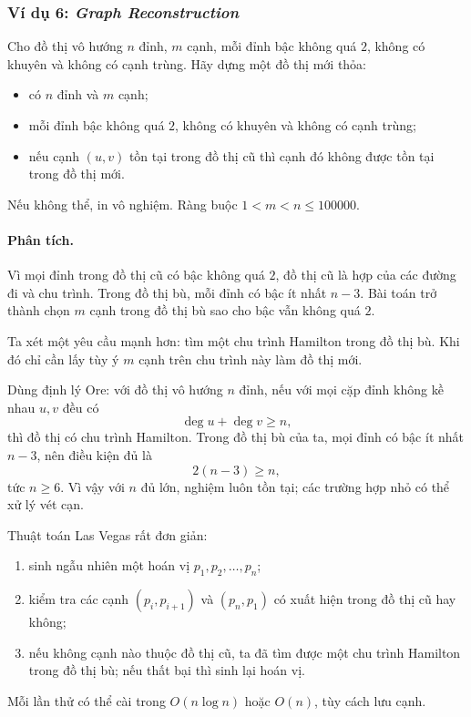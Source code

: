\documentclass[11pt]{article}
\begin{document}
\subsubsection{Ví dụ 6: \emph{Graph Reconstruction}}

Cho đồ thị vô hướng \(n\) đỉnh, \(m\) cạnh, mỗi đỉnh bậc không quá \(2\), không
có khuyên và không có cạnh trùng. Hãy dựng một đồ thị mới thỏa:
\begin{itemize}
  \item có \(n\) đỉnh và \(m\) cạnh;
  \item mỗi đỉnh bậc không quá \(2\), không có khuyên và không có cạnh trùng;
  \item nếu cạnh \((u,v)\) tồn tại trong đồ thị cũ thì cạnh đó không được tồn
  tại trong đồ thị mới.
\end{itemize}
Nếu không thể, in vô nghiệm. Ràng buộc \(1<m<n\le 100000\).

\paragraph{Phân tích.}
Vì mọi đỉnh trong đồ thị cũ có bậc không quá \(2\), đồ thị cũ là hợp của các
đường đi và chu trình. Trong đồ thị bù, mỗi đỉnh có bậc ít nhất \(n-3\). Bài
toán trở thành chọn \(m\) cạnh trong đồ thị bù sao cho bậc vẫn không quá \(2\).

Ta xét một yêu cầu mạnh hơn: tìm một chu trình Hamilton trong đồ thị bù. Khi đó
chỉ cần lấy tùy ý \(m\) cạnh trên chu trình này làm đồ thị mới.

Dùng định lý Ore: với đồ thị vô hướng \(n\) đỉnh, nếu với mọi cặp đỉnh không kề
nhau \(u,v\) đều có
\[
  \deg u+\deg v\ge n,
\]
thì đồ thị có chu trình Hamilton. Trong đồ thị bù của ta, mọi đỉnh có bậc ít
nhất \(n-3\), nên điều kiện đủ là
\[
  2(n-3)\ge n,
\]
tức \(n\ge6\). Vì vậy với \(n\) đủ lớn, nghiệm luôn tồn tại; các trường hợp nhỏ
có thể xử lý vét cạn.

Thuật toán Las Vegas rất đơn giản:
\begin{enumerate}
  \item sinh ngẫu nhiên một hoán vị \(p_1,p_2,\ldots,p_n\);
  \item kiểm tra các cạnh \((p_i,p_{i+1})\) và \((p_n,p_1)\) có xuất hiện trong
  đồ thị cũ hay không;
  \item nếu không cạnh nào thuộc đồ thị cũ, ta đã tìm được một chu trình
  Hamilton trong đồ thị bù; nếu thất bại thì sinh lại hoán vị.
\end{enumerate}
Mỗi lần thử có thể cài trong \(O(n\log n)\) hoặc \(O(n)\), tùy cách lưu cạnh.
\end{document}
